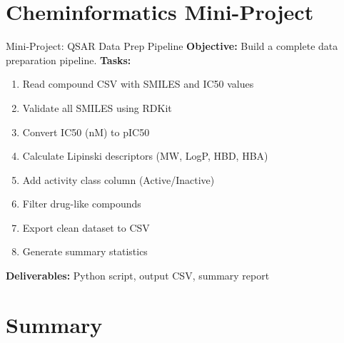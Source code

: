 \documentclass{beamer}
\begin{document}
\section{Cheminformatics Mini-Project}

\begin{frame}{Mini-Project: QSAR Data Prep Pipeline}
    \footnotesize
    \textbf{Objective:} Build a complete data preparation pipeline.
    \vspace{0.3em}
    \textbf{Tasks:}
    \begin{enumerate}\setlength{\itemsep}{0pt}
        \item Read compound CSV with SMILES and IC50 values
        \item Validate all SMILES using RDKit
        \item Convert IC50 (nM) to pIC50
        \item Calculate Lipinski descriptors (MW, LogP, HBD, HBA)
        \item Add activity class column (Active/Inactive)
        \item Filter drug-like compounds
        \item Export clean dataset to CSV
        \item Generate summary statistics
    \end{enumerate}
    \vspace{0.2em}
    \textbf{Deliverables:} Python script, output CSV, summary report
\end{frame}

\section{Summary}
\end{document}
